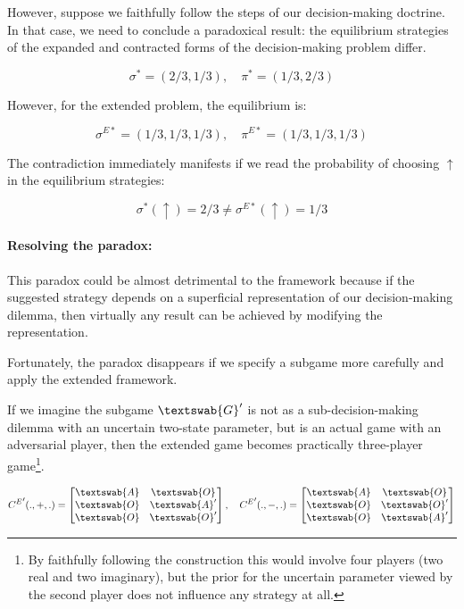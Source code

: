 \documentclass{article}
\begin{document}
However, suppose we faithfully follow the steps of our decision-making doctrine. In that case, we need to conclude a paradoxical result: the equilibrium strategies of the expanded and contracted forms of the decision-making problem differ.

\[
\sigma^*=(2/3,1/3), \quad
\pi^*=(1/3,2/3)
\]

However, for the extended problem, the equilibrium is:

\[
\sigma^{E*}=(1/3,1/3,1/3), \quad
\pi^{E*}=(1/3,1/3,1/3)
\]

The contradiction immediately manifests if we read the probability of choosing $\uparrow$ in the equilibrium strategies:

\[
\sigma^*(\uparrow) = 2/3 \neq \sigma^{E*}(\uparrow) = 1/3
\]

\paragraph{Resolving the paradox:}
This paradox could be almost detrimental to the framework because if the suggested strategy depends on a superficial representation of our decision-making dilemma, then virtually any result can be achieved by modifying the representation.

Fortunately, the paradox disappears if we specify a subgame more carefully and apply the extended framework.

If we imagine the subgame $\textswab{G}'$ is not as a sub-decision-making dilemma with an uncertain two-state parameter, but is an actual game with an adversarial player, then the extended game becomes practically three-player game\footnote{By faithfully following the construction this would involve four players (two real and two imaginary), but the prior for the uncertain parameter viewed by the second player does not influence any strategy at all.}.


\[
{C^E}'(.,+,.)=
\begin{bmatrix}
\textswab{A} & \textswab{O} \\
\textswab{O} & \textswab{A}' \\
\textswab{O} & \textswab{O}'
\end{bmatrix}, \quad
{C^E}'(.,-,.)=
\begin{bmatrix}
\textswab{A} & \textswab{O} \\
\textswab{O} & \textswab{O}' \\
\textswab{O} & \textswab{A}'
\end{bmatrix}
\]
\end{document}
